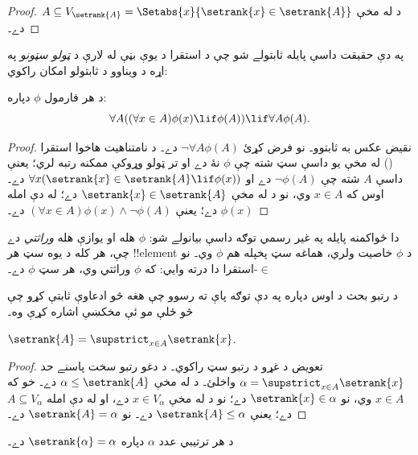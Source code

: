\documentclass[../../../include/open-logic-section]{subfiles}
\begin{document}
\begin{proof}
د  له مخې
$A \subseteq V_{\setrank{A}} = \Setabs{x}{\setrank{x} \in
\setrank{A}}$ دے۔
\end{proof}
\noindent
په دې حقيقت داسې پايله ثابتولے شو چې د استقرا د يوې بڼې له لارې د
\emph{ټولو سټونو} په اړه د ويناوو د ثابتولو امکان راکوي:

\begin{thm}
د هر فارمول $\phi$ دپاره:
\[
	\forall A((\forall x \in A)\phi(x) \lif \phi(A)) \lif \forall A \phi(A).
\]
\end{thm}

\begin{proof}
نقيض عکس به ثابتوو۔ نو فرض کړئ $\lnot \forall A
\phi(A)$ دے۔ د نامتناهيت هاخوا استقرا
() له مخې يو داسې سټ شته
چې $\phi$ نۀ دے او تر ټولو وړوکې ممکنه رتبه لري؛ يعنې داسې $A$ شته
چې $\lnot \phi(A)$ دے او $\forall x(\setrank{x} \in \setrank{A}
\lif \phi(x))$ دے۔ اوس که $x \in A$ وي، نو د
 له مخې $\setrank{x} \in
\setrank{A}$ دے؛ له دې امله $\phi(x)$ دے؛ يعنې $(\forall x \in
A)\phi(x) \land \lnot \phi(A)$ دے۔
\end{proof}\noindent دا ځواکمنه پايله په غير رسمي توګه داسې بيانولے
شو: $\phi$ هله او يوازې هله \emph{وراثتي} دے چې، هر کله د يوه سټ
هر !!{element} د $\phi$ خاصيت ولري، هماغه سټ پخپله هم $\phi$ وي۔ نو
$\in$-استقرا دا درته وايي: که $\phi$ وراثتي وي، هر سټ $\phi$ دے۔

د رتبو بحث د اوس دپاره په دې توګه پاې ته رسوو چې هغه څو ادعاوې
ثابتې کړو چې څو ځلې مو ئې مخکښې اشاره کړې وه۔

\begin{prop}
$\setrank{A} = \supstrict_{x \in A}\setrank{x}$.
\end{prop}

\begin{proof}
تعويض د غړو د رتبو سټ راکوي۔ د دغو رتبو سخت پاسنے حد
$\alpha = \supstrict_{x \in A}\setrank{x}$ واخلئ۔ د
 له مخې $\alpha \leq \setrank{A}$ دے۔ خو که
$x \in A$ وي، نو $\setrank{x} \in \alpha$ دے؛ نو د
 له مخې $x \in V_\alpha$ دے، او له دې امله
$A \subseteq V_\alpha$ دے؛ يعنې $\setrank{A} \leq \alpha$ دے۔ نو
$\setrank{A} = \alpha$ دے۔
\end{proof}

\begin{cor}
د هر ترتيبي عدد $\alpha$ دپاره $\setrank{\alpha} = \alpha$ دے۔
\end{cor}
\end{document}
